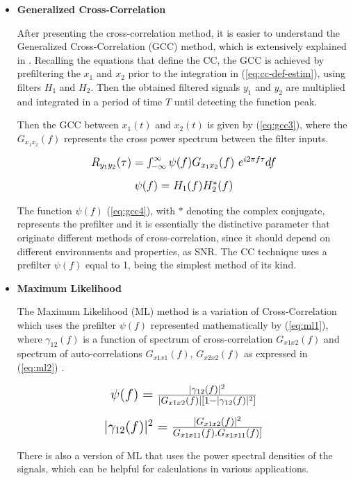 \begin{itemize}
	\item \textbf{Generalized Cross-Correlation}

After presenting the cross-correlation method, it is easier to understand the Generalized Cross-Correlation (GCC) method, which is extensively explained in \cite{crosscorr}. Recalling the equations that define the CC, the GCC is achieved by prefiltering the $x_1$ and $x_2$ prior to the integration in (\ref{eq:cc-def-estim}), using filters $H_1$ and $H_2$. Then the obtained filtered signals $y_1$ and $y_2$ are multiplied and integrated in a period of time $T$ until detecting the function peak.

Then the GCC between $x_1(t)$ and $x_2(t)$ is given by (\ref{eq:gcc3}), where the $G_{x_1x_2}(f)$ represents the cross power spectrum between the filter inputs. 

\begin{equation}
	\mbox{\large\( %
	R_{y_1y_2}(\tau) = \int_{-\infty}^{\infty} \psi(f) G_{x_1x_2}(f)\ e^{i2\pi f\tau} df
	\)} %
	\label{eq:gcc3}
\end{equation}


\begin{equation}%
	\mbox{\large\( %
		\psi(f) = H_1(f)H_2^*(f) %
		\)} %
		\label{eq:gcc4}	
\end{equation}

The function $\psi(f)$ (\ref{eq:gcc4}), with $*$ denoting the complex conjugate, represents the prefilter and it is essentially the distinctive parameter that originate different methods of cross-correlation, since it should depend on different environments and properties, as SNR. The CC technique uses a prefilter $\psi(f)$ equal to 1, being the simplest method of its kind.

\item \textbf{Maximum Likelihood}

The Maximum Likelihood (ML) method is a variation of Cross-Correlation which uses the prefilter $\psi(f)$ represented mathematically by (\ref{eq:ml1}), where $\gamma_{12}(f)$ is a function of spectrum of cross-correlation $G_{x1x2}(f)$ and spectrum of auto-correlations $G_{x1x1}(f)$, $G_{x2x2}(f)$ as expressed in (\ref{eq:ml2}) \cite{crosscorr}.

\begin{equation}
	\mbox{\Large\( %
\psi(f) = \frac{|\gamma_{12}(f)|^2}{|G_{x1x2}(f)|[1-|\gamma_{12}(f)|^2]}
	\)} %
\label{eq:ml1} 
\end{equation}

\begin{eqnarray}
	\mbox{\Large\( %
	|\gamma_{12}(f)|^2 = \frac{|G_{x1x2}(f)|^2}{G_{x1x11}(f) . G_{x1x11}(f)]}
	\)} %
\label{eq:ml2} 
\end{eqnarray}

There is also a version of ML that uses the power spectral densities of the signals, which can be helpful for calculations in various applications. 
\end{itemize}

